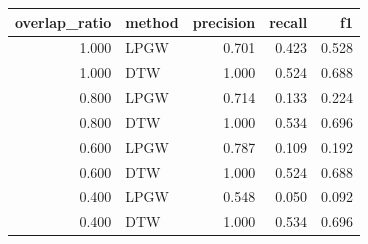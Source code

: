\begin{tabular}{rlrrr}
\toprule
overlap\_ratio & method & precision & recall & f1 \\
\midrule
1.000 & LPGW & 0.701 & 0.423 & 0.528 \\
1.000 & DTW & 1.000 & 0.524 & 0.688 \\
0.800 & LPGW & 0.714 & 0.133 & 0.224 \\
0.800 & DTW & 1.000 & 0.534 & 0.696 \\
0.600 & LPGW & 0.787 & 0.109 & 0.192 \\
0.600 & DTW & 1.000 & 0.524 & 0.688 \\
0.400 & LPGW & 0.548 & 0.050 & 0.092 \\
0.400 & DTW & 1.000 & 0.534 & 0.696 \\
\bottomrule
\end{tabular}
